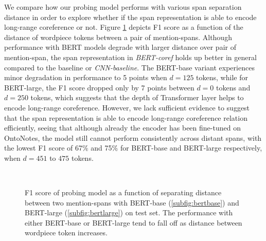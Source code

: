 \documentclass[11pt]{article}
\begin{document}
We compare how our probing model performs with various span separation distance in order to explore whether if the span representation is able to encode long-range coreference or not. Figure \ref{fig:longrange_result} depicts F1 score as a function of the distance of wordpiece tokens between a pair of mention-spans. Although performance with BERT models degrade with larger distance over pair of mention-span, the span representation in \textit{BERT-coref} holds up better in general compared to the baseline or \textit{CNN-baseline}. The BERT-base variant experiences minor degradation in performance to 5 points when $d=125$ tokens, while for BERT-large, the F1 score dropped only by 7 points between $d=0$ tokens and $d=250$ tokens, which suggests that the depth of Transformer layer helps to encode long-range coreference. However, we lack sufficient evidence to suggest that the span representation is able to encode long-range coreference relation efficiently, seeing that although already the encoder has been fine-tuned on OntoNotes, the model still cannot perform consistently across distant spans, with the lowest F1 score of 67\% and 75\% for BERT-base and BERT-large respectively, when $d=451$ to $475$ tokens.
\begin{figure}[h]
 \\
  \caption{F1 score of probing model as a function of separating distance between two mention-spans with BERT-base (\ref{subfig:bertbase}) and BERT-large (\ref{subfig:bertlarge}) on test set. The performance with either BERT-base or BERT-large tend to fall off as distance between wordpiece token increases.}
  \label{fig:longrange_result} 
\end{figure}
\end{document}
